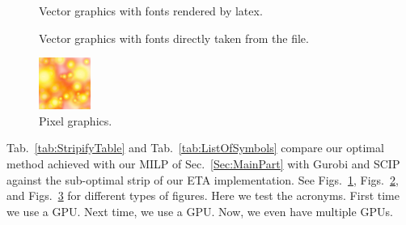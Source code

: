 \begin{figure}
    
    \caption{Vector graphics with fonts rendered by latex.}\label{fig:latexfonts}
\end{figure}

\begin{figure}
    
    \caption{Vector graphics with fonts directly taken from the file.}\label{fig:svgfonts}
\end{figure}

\begin{figure}
    \centering
    \includegraphics[width=\columnwidth]{imgs/img.png}
    \caption{Pixel graphics.}\label{fig:pixel}
\end{figure}

Tab.~\ref{tab:StripifyTable} and Tab.~\ref{tab:ListOfSymbols} compare our optimal 
method achieved with our 
\ac{MILP} 
of Sec.~\ref{Sec:MainPart} with Gurobi and SCIP against the sub-optimal strip of our 
\ac{ETA} 
implementation.
See Figs.~\ref{fig:latexfonts}, Figs.~\ref{fig:svgfonts}, and Figs.~\ref{fig:pixel} for different types of figures.
Here we test the acronyms.
First time we use a \ac{GPU}.
Next time, we use a \ac{GPU}.
Now, we even have multiple \acp{GPU}.
